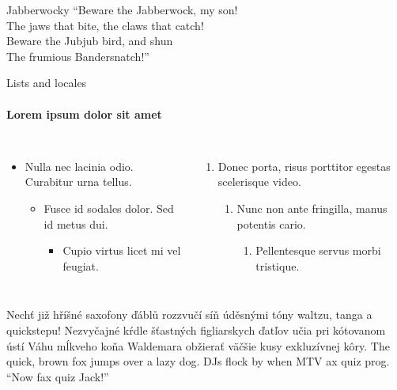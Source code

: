 \documentclass{beamer}
\begin{document}
\begin{darkframes}
\begin{frame}{Jabberwocky}
      “Beware the Jabberwock, my son!\\
      The jaws that bite, the claws that catch!\\
      Beware the Jubjub bird, and shun\\
      The frumious Bandersnatch!”\\
    \end{frame}

    \begin{frame}[label=lists]{Lists and locales}
      \framesubtitle{Lorem ipsum dolor sit amet}
      \begin{columns}[onlytextwidth]
          \begin{itemize}
            \item Nulla nec lacinia odio. Curabitur urna tellus.
            \begin{itemize}
              \item Fusce id sodales dolor. Sed id metus dui.
              \begin{itemize}
                \item Cupio virtus licet mi vel feugiat.
              \end{itemize}
            \end{itemize}
          \end{itemize}
          \begin{enumerate}
            \item Donec porta, risus porttitor egestas scelerisque video.
            \begin{enumerate}
              \item Nunc non ante fringilla, manus potentis cario.
              \begin{enumerate}
                \item Pellentesque servus morbi tristique.
              \end{enumerate}
            \end{enumerate}
          \end{enumerate}
      \end{columns}
      \bigskip
      \justifying

      {Nechť již hříšné saxofony ďáblů
      rozzvučí síň úděsnými tóny waltzu, tanga a quickstepu!}
      { Nezvyčajné kŕdle šťastných figliarskych
      ďatľov učia pri kótovanom ústí Váhu mĺkveho koňa Waldemara
      obžierať väč\-šie kusy exkluzívnej kôry.}
      {The quick, brown fox jumps over a lazy
      dog. DJs flock by when MTV ax quiz prog. “Now fax quiz Jack!”}
    \end{frame}


\end{darkframes}
\end{document}
